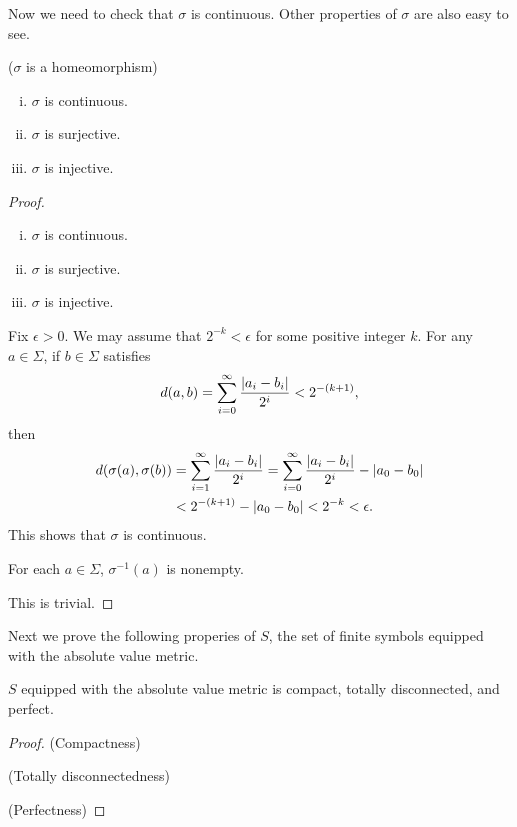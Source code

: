 \documentclass[12pt,twoside]{book}
\begin{document}
Now we need to check that $\sigma$ is continuous.
Other properties of $\sigma$ are also easy to see.
\begin{proposition}
  ($\sigma$ is a homeomorphism)
  \begin{enumerate}[(i)]
    \item $\sigma$ is continuous.
    \item  $\sigma$ is surjective.
    \item  $\sigma$ is injective.
  \end{enumerate}
  \begin{proof}
    \begin{enumerate}[(i)]
      \item $\sigma$ is continuous.
      \item  $\sigma$ is surjective.
      \item  $\sigma$ is injective.
    \end{enumerate}
  \item
    Fix $\epsilon > 0$.
    We may assume that $2^{-k} < \epsilon$ for some positive integer $k$.
    For any $a \in \Sigma$, if $b \in \Sigma$ satisfies
    \begin{equation*}
      d(a,b) = \sum\limits_{i=0}^{\infty} \frac{\left | a_i - b_i \right |}{2^i} < 2^{-(k+1)},
    \end{equation*}
    then 
    \begin{align*}
      d(\sigma(a), \sigma(b)) 
      &= \sum\limits_{i=1}^{\infty} \frac{\left | a_i - b_i \right |}{2^i} 
      = \sum\limits_{i=0}^{\infty} \frac{\left | a_i - b_i \right |}{2^i} - \left | a_0 - b_0 \right |  \\
      &< 2^{-(k+1)} - \left | a_0 - b_0 \right |
      < 2^{-k}
      < \epsilon.
    \end{align*}
    This shows that $\sigma$ is continuous.
  \item
    For each $a \in \Sigma$, $\sigma^{-1}(a)$ is nonempty.
  \item
    This is trivial.
  \end{proof}
  \label{prop:symb-sigma-cont}
\end{proposition}
Next we prove the following properies of $S$, the set of finite symbols equipped with the absolute value metric.
\begin{proposition}
  $S$ equipped with the absolute value metric is compact, totally disconnected, and perfect.
  \begin{proof}
    (Compactness)

    (Totally disconnectedness)

    (Perfectness)

  \end{proof}
\end{proposition}
\end{document}
